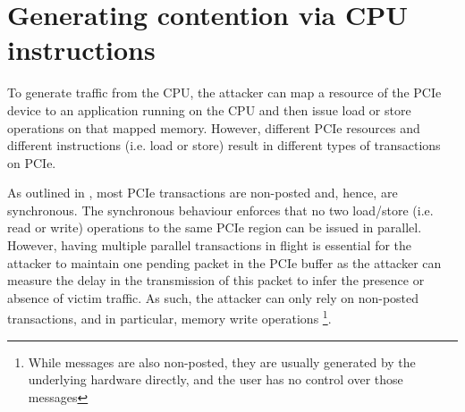 \section{Generating contention via CPU instructions}
\label{sec:interconnect-sc-store-ops}

To generate traffic from the CPU, the attacker can map a resource of the PCIe device to an application running on the CPU and then issue load or store operations on that mapped memory.
However, different PCIe resources and different instructions (i.e. load or store) result in different types of transactions on PCIe.

As outlined in , most PCIe transactions are non-posted and, hence, are synchronous.
The synchronous behaviour enforces that no two load/store (i.e. read or write) operations to the same PCIe region can be issued in parallel.
However, having multiple parallel transactions in flight is essential for the attacker to maintain one pending packet in the PCIe buffer as the attacker can measure the delay in the transmission of this packet to infer the presence or absence of victim traffic. 
As such, the attacker can only rely on non-posted transactions, and in particular, memory write operations
\footnote{While messages are also non-posted, they are usually generated by the underlying hardware directly, and the user has no control over those messages}.






